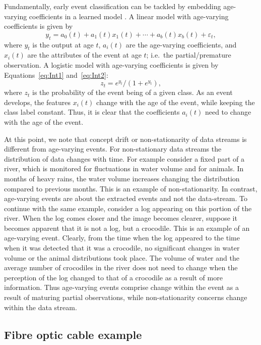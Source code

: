 \documentclass[a4paper,11pt]{article}
\begin{document}
Fundamentally, early event classification can be tackled by embedding age-varying coefficients in a learned model \citep{hastie1993varying}. A linear model with age-varying coefficients is given by
\begin{equation}\label{eq:Int1}
	y_t = a_0(t) + a_1(t) x_1(t) + \cdots + a_b(t)x_b(t) + \varepsilon_t ,
\end{equation}
where $y_t$ is the output at age $t$, $a_i(t)$ are the age-varying coefficients, and $x_i(t)$ are the attributes of the event at age $t$; i.e.\ the partial/premature observation. A logistic model with age-varying coefficients is given by Equations~\eqref{eq:Int1} and~\eqref{eq:Int2}:
\begin{equation}\label{eq:Int2}
	z_t = e^{y_t}/(1 + e^{y_t})  ,
\end{equation}
where $z_t$ is the probability of the event being of a given class. As an event develops, the features $x_i(t)$ change with the age of the event, while keeping the class label constant. Thus, it is clear that the coefficients $a_i(t)$ need to change with the age of the event.

At this point, we note that concept drift \citep{gama2014survey} or non-stationarity of data streams \citep{hulten2001mining} is different from age-varying events. For non-stationary data streams the distribution of data changes with time. For example consider a fixed part of a river, which is monitored for fluctuations in water volume and for animals. In months of heavy rains, the water volume increases changing the distribution compared to previous months. This is an example of non-stationarity. In contrast, age-varying events are about the extracted events and not the data-stream. To continue with the same example, consider a log appearing on this portion of the river. When the log comes closer and the image becomes clearer, suppose it becomes apparent that it is not a log, but a crocodile. This is an example of an age-varying event. Clearly, from the time when the log appeared to the time when it was detected that it was a crocodile, no significant changes in water volume or the animal distributions took place. The volume of water and the average number of crocodiles in the river does not need to change when the perception of the log changed to that of a crocodile as a result of more information. Thus age-varying events comprise change within the event as a result of maturing partial observations, while non-stationarity concerns change within the data stream.

\subsection{Fibre optic cable example}\label{subsec:RealWorld}
\end{document}

